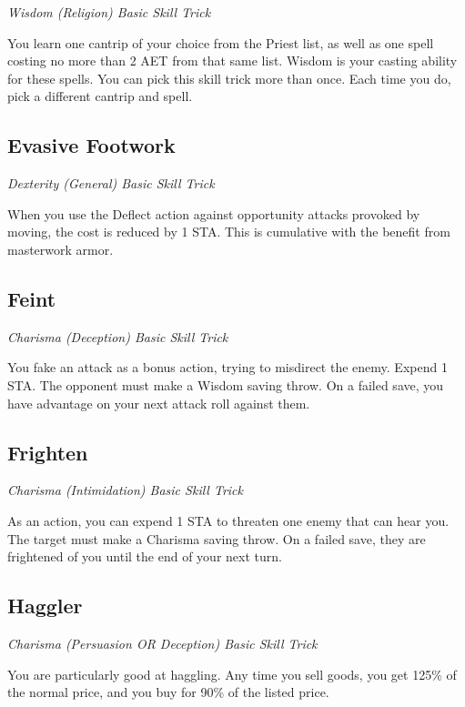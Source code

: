 \textit{Wisdom (Religion) Basic Skill Trick}

You learn one cantrip of your choice from the Priest list, as well as one spell costing no more than 2 AET from that same list. Wisdom is your casting ability for these spells. You can pick this skill trick more than once. Each time you do, pick a different cantrip and spell.

\subsection{Evasive Footwork}

\textit{Dexterity (General) Basic Skill Trick}

When you use the Deflect action against opportunity attacks provoked by moving, the cost is reduced by 1 STA. This is cumulative with the benefit from masterwork armor.

\subsection{Feint}\label{st:feint}

\textit{Charisma (Deception) Basic Skill Trick}

You fake an attack as a bonus action, trying to misdirect the enemy. Expend 1 STA. The opponent must make a Wisdom saving throw. On a failed save, you have advantage on your next attack roll against them.

\subsection{Frighten} \label{st:frighten}

\textit{Charisma (Intimidation) Basic Skill Trick}

As an action, you can expend 1 STA to threaten one enemy that can hear you. The target must make a Charisma saving throw. On a failed save, they are frightened of you until the end of your next turn.

\subsection{Haggler}\label{st:haggler}

\textit{Charisma (Persuasion OR Deception) Basic Skill Trick}

You are particularly good at haggling. Any time you sell goods, you get 125\% of the normal price, and you buy for 90\% of the listed price.

